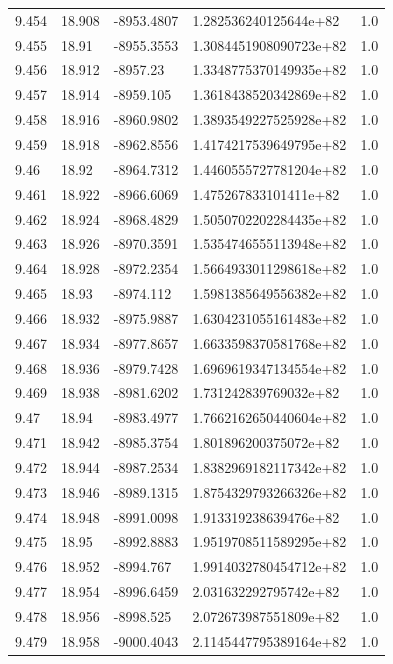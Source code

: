 \begin{tabular}{lllll}
9.454 & 18.908 & -8953.4807 & 1.282536240125644e+82 & 1.0 \\
9.455 & 18.91 & -8955.3553 & 1.3084451908090723e+82 & 1.0 \\
9.456 & 18.912 & -8957.23 & 1.3348775370149935e+82 & 1.0 \\
9.457 & 18.914 & -8959.105 & 1.3618438520342869e+82 & 1.0 \\
9.458 & 18.916 & -8960.9802 & 1.3893549227525928e+82 & 1.0 \\
9.459 & 18.918 & -8962.8556 & 1.4174217539649795e+82 & 1.0 \\
9.46 & 18.92 & -8964.7312 & 1.4460555727781204e+82 & 1.0 \\
9.461 & 18.922 & -8966.6069 & 1.475267833101411e+82 & 1.0 \\
9.462 & 18.924 & -8968.4829 & 1.5050702202284435e+82 & 1.0 \\
9.463 & 18.926 & -8970.3591 & 1.5354746555113948e+82 & 1.0 \\
9.464 & 18.928 & -8972.2354 & 1.5664933011298618e+82 & 1.0 \\
9.465 & 18.93 & -8974.112 & 1.5981385649556382e+82 & 1.0 \\
9.466 & 18.932 & -8975.9887 & 1.6304231055161483e+82 & 1.0 \\
9.467 & 18.934 & -8977.8657 & 1.6633598370581768e+82 & 1.0 \\
9.468 & 18.936 & -8979.7428 & 1.6969619347134554e+82 & 1.0 \\
9.469 & 18.938 & -8981.6202 & 1.731242839769032e+82 & 1.0 \\
9.47 & 18.94 & -8983.4977 & 1.7662162650440604e+82 & 1.0 \\
9.471 & 18.942 & -8985.3754 & 1.801896200375072e+82 & 1.0 \\
9.472 & 18.944 & -8987.2534 & 1.8382969182117342e+82 & 1.0 \\
9.473 & 18.946 & -8989.1315 & 1.8754329793266326e+82 & 1.0 \\
9.474 & 18.948 & -8991.0098 & 1.913319238639476e+82 & 1.0 \\
9.475 & 18.95 & -8992.8883 & 1.9519708511589295e+82 & 1.0 \\
9.476 & 18.952 & -8994.767 & 1.9914032780454712e+82 & 1.0 \\
9.477 & 18.954 & -8996.6459 & 2.031632292795742e+82 & 1.0 \\
9.478 & 18.956 & -8998.525 & 2.072673987551809e+82 & 1.0 \\
9.479 & 18.958 & -9000.4043 & 2.1145447795389164e+82 & 1.0 \\

\end{tabular}
